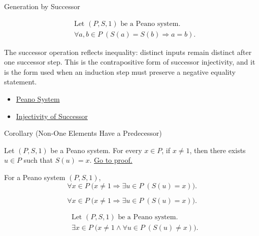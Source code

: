 \begin{topicbox}{Generation by Successor}
\begin{remark*}
\[
\begin{aligned}
&\text{Let } (P,S,1) \text{ be a Peano system.}\\
&\forall a,b \in P\;(S(a)=S(b) \Longrightarrow a=b).
\end{aligned}
\]
\end{remark*}

\begin{remark*}[Interpretation]
The successor operation reflects inequality: distinct inputs remain distinct
after one successor step. This is the contrapositive form of successor
injectivity, and it is the form used when an induction step must preserve a
negative equality statement.
\end{remark*}

\begin{dependencies}
\begin{itemize}
  \item \hyperref[def:peano-system]{Peano System}
  \item \hyperref[ax:peano-successor-injective]{Injectivity of Successor}
\end{itemize}
\end{dependencies}

\begin{corollarybox}{Corollary (Non-One Elements Have a Predecessor)}
\begin{corollary}
\label{cor:non-one-elements-have-a-predecessor}
Let $(P,S,1)$ be a Peano system. For every $x \in P$, if $x \neq 1$, then
there exists $u \in P$ such that $S(u)=x$.
\hyperref[prf:non-one-elements-have-a-predecessor]{Go to proof.}
\end{corollary}
\end{corollarybox}

\begin{remark*}
For a Peano system $(P,S,1)$,
\[
\forall x \in P\;\bigl(x\neq 1 \Longrightarrow
\exists u \in P\;(S(u)=x)\bigr).
\]
\end{remark*}

\begin{remark*}
\[
\forall x \in P\;\bigl(x\neq 1 \Longrightarrow
\exists u \in P\;(S(u)=x)\bigr).
\]
\end{remark*}

\begin{remark*}
\[
\begin{aligned}
&\text{Let } (P,S,1) \text{ be a Peano system.}\\
&\exists x \in P\;\bigl(x\neq 1 \land
\forall u \in P\;(S(u)\neq x)\bigr).
\end{aligned}
\]
\end{remark*}


\end{topicbox}
